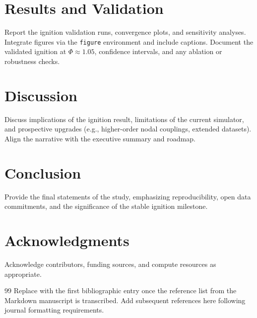 \documentclass[11pt]{article}
\begin{document}
\section{Results and Validation}
Report the ignition validation runs, convergence plots, and sensitivity analyses. Integrate figures via the \texttt{figure} environment and include captions. Document the validated ignition at \(\Phi \approx 1.05\), confidence intervals, and any ablation or robustness checks.

\section{Discussion}
Discuss implications of the ignition result, limitations of the current simulator, and prospective upgrades (e.g., higher-order nodal couplings, extended datasets). Align the narrative with the executive summary and roadmap.

\section{Conclusion}
Provide the final statements of the study, emphasizing reproducibility, open data commitments, and the significance of the stable ignition milestone.

\section*{Acknowledgments}
Acknowledge contributors, funding sources, and compute resources as appropriate.

\begin{thebibliography}{99}
 Replace with the first bibliographic entry once the reference list from the Markdown manuscript is transcribed.
 Add subsequent references here following journal formatting requirements.
\end{thebibliography}
\end{document}
